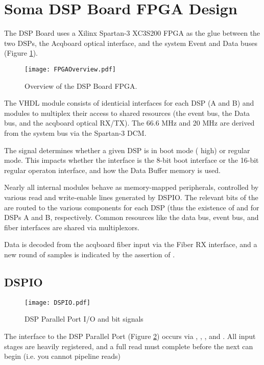 \section{Soma DSP Board FPGA Design}


The DSP Board uses a Xilinx Spartan-3 XC3S200 FPGA as the glue between
the two DSPs, the Acqboard optical interface, and the system Event and
Data buses (Figure \ref{DSPboard.FPGA}).
  
\begin{figure}[h!]
\texttt{[image: FPGAOverview.pdf]}
\caption{Overview of the DSP Board FPGA.}
\label{DSPboard.FPGA}
\end{figure}
  
The VHDL module consists of identicial interfaces for each DSP (A and
B) and modules to multiplex their access to shared resources (the
event bus, the Data bus, and the acqboard optical RX/TX). The 66.6 MHz
 and 20 MHz  are derived from the system
bus  via the Spartan-3 DCM.


The  signal determines whether a given DSP is in boot
mode ( high) or regular mode. This impacts whether the
interface is the 8-bit boot interface or the 16-bit regular operaton
interface, and how the Data Buffer memory is used.
  
Nearly all internal modules behave as memory-mapped peripherals,
controlled by various read and write-enable lines generated by DSPIO.
The relevant bits of the  are routed to the various
components for each DSP (thus the existence of 
and  for DSPs A and B, respectively. Common
resources like the data bus, event bus, and fiber interfaces are
shared via multiplexors.
  
Data is decoded from the acqboard fiber input via the Fiber RX
interface, and a new round of samples is indicated by the assertion of
.

\subsection{DSPIO}

\begin{figure}[h!]
\texttt{[image: DSPIO.pdf]}
\caption{DSP Parallel Port I/O and bit signals}
\label{DSPIO}
\end{figure}

The interface to the DSP Parallel Port (Figure \ref{DSPIO}) occurs via
, , , and . All
input stages are heavily registered, and a full read must complete
before the next can begin (i.e. you cannot pipeline reads)

